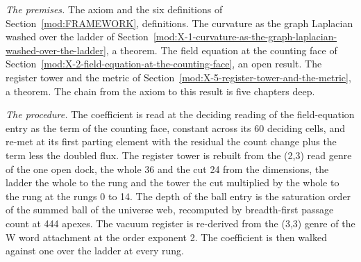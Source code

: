 \begin{chproof}
\textit{The premises.} The axiom and the six definitions of Section~\ref{mod:FRAMEWORK}, definitions. The curvature as the graph Laplacian washed over the ladder of Section~\ref{mod:X-1-curvature-as-the-graph-laplacian-washed-over-the-ladder}, a theorem. The field equation at the counting face of Section~\ref{mod:X-2-field-equation-at-the-counting-face}, an open result. The register tower and the metric of Section~\ref{mod:X-5-register-tower-and-the-metric}, a theorem. The chain from the axiom to this result is five chapters deep.

\textit{The procedure.} The coefficient is read at the deciding reading of the field-equation entry as the term of the counting face, constant across its 60 deciding cells, and re-met at its first parting element with the residual the count change plus the term less the doubled flux. The register tower is rebuilt from the (2,3) read genre of the one open dock, the whole 36 and the cut 24 from the dimensions, the ladder the whole to the rung and the tower the cut multiplied by the whole to the rung at the rungs 0 to 14. The depth of the ball entry is the saturation order of the summed ball of the universe web, recomputed by breadth-first passage count at 444 apexes. The vacuum register is re-derived from the (3,3) genre of the W word attachment at the order exponent 2. The coefficient is then walked against one over the ladder at every rung.


\end{chproof}
